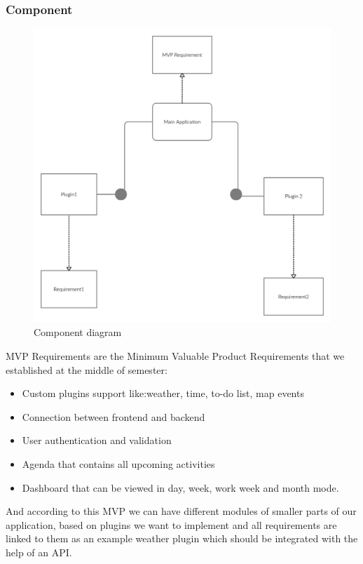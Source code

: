 \subsubsection{Component}
\par
\begin{figure}[h]
	\includegraphics[width=\textwidth]{componentdigram1}	
	\caption{Component diagram}
\end{figure}
\par MVP Requirements are the Minimum Valuable Product Requirements that we established at the middle of semester: 
\begin{itemize}
	\item Custom plugins support like:weather, time, to-do list, map events
	\item Connection between frontend and backend
	\item User authentication and validation
	\item Agenda that contains all upcoming activities
	\item Dashboard that can be viewed in day, week, work week and month mode.
	
\end{itemize}

And according to this MVP we can have different modules of smaller parts of our application, based on plugins we want to implement and all requirements are linked to them as an example weather plugin which should be integrated with the help of an API.


